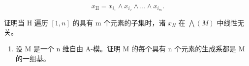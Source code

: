 \[
x _ {\mathrm{H}} = x _ {i _ {1}} \wedge x _ {i _ {2}} \wedge \dots \wedge x _ {i _ {m}}.
\]

证明当 H 遍历 \([1, n]\) 的具有 m 个元素的子集时，诸 \(x_{H}\) 在 \(\bigwedge(M)\) 中线性无关。

\begin{enumerate}
\def\labelenumi{\arabic{enumi}.}
\setcounter{enumi}{14}
\tightlist
\item
  设 M 是一个 n 维自由 A-模。证明 M 的每个具有 n 个元素的生成系都是 M 的一组基。
\end{enumerate}

